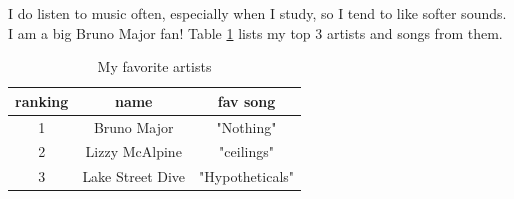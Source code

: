 \documentclass{article}
\begin{document}
  \hspace{1cm}

  \noindent I do listen to music often, especially when I study, so I tend to like softer sounds. I am a big Bruno Major fan! 
  Table \ref{tab:music} lists my top 3 artists and songs from them. 

    \begin{table}[ht!]
      \begin{center}
        \caption{My favorite artists} 
        \label{tab:music} 
        \begin{tabular}{c|c|c} 
          \textbf{ranking} & \textbf{name} & \textbf{fav song}\\
          \hline
          1 & Bruno Major & "Nothing" \cite{SONG:1} \\
          2 & Lizzy McAlpine & "ceilings" \cite{SONG:2} \\
          3 & Lake Street Dive & "Hypotheticals" \cite{SONG:3} \\
        \end{tabular}
      \end{center}
    \end{table}


  
   
\end{document}
